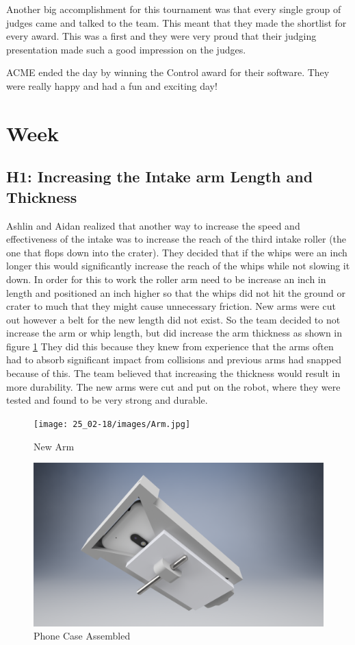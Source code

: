 \documentclass{article}
\begin{document}
Another big accomplishment for this tournament was that every single group of judges came and talked to the team. This meant that they made the shortlist for every award. This was a first and they were very proud that their judging presentation made such a good impression on the judges. 

ACME ended the day by winning the Control award for their software. They were really happy and had a fun and exciting day!
\clearpage \newpage \section{Week \thesection} 
\subsection{H1: Increasing the Intake arm Length and Thickness}

Ashlin and Aidan realized that another way to increase the speed and effectiveness of the intake was to increase the reach of the third intake roller (the one that flops down into the crater). They decided that if the whips were an inch longer this would significantly increase the reach of the whips while not slowing it down. In order for this to work the roller arm need to be increase an inch in length and positioned an inch higher so that the whips did not hit the ground or crater to much that they might cause unnecessary friction. New arms were cut out however a belt for the new length did not exist. So the team decided to not increase the arm or whip length, but did increase the arm thickness as shown in figure \ref{fig:arm} They did this because they knew from experience that the arms often had to absorb significant impact from collisions and previous arms had snapped because of this. The team believed that increasing the thickness would result in more durability. The new arms were cut and put on the robot, where they were tested and found to be very strong and durable.

\begin{figure}
    \centering
    \texttt{[image: 25\_02-18/images/Arm.jpg]}
    \caption{New Arm}
    \label{fig:arm}
\end{figure}

\begin{figure}
    \centering
    \includegraphics[width= 0.5 \textwidth]{25_02-18/images/phonemount.png}
    \caption{Phone Case Assembled}
    \label{fig: phone case}
\end{figure}
\end{document}
